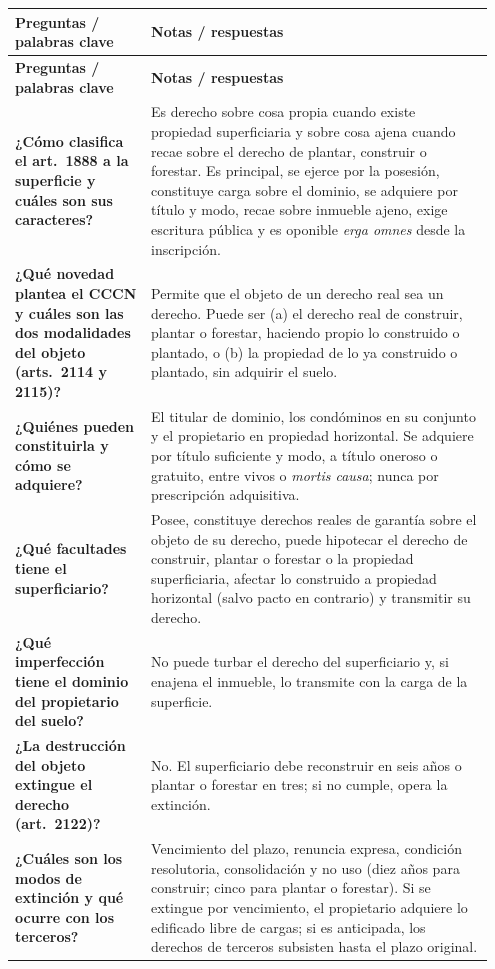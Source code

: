 \documentclass[12pt,oneside]{book}
\makeatletter
\newenvironment{cornell}{%
    \par\vspace{0.5em}
    \noindent
    \begin{longtable}{@{}>{\raggedright\arraybackslash}p{0.27\linewidth}
                         >{\raggedright\arraybackslash}p{0.68\linewidth}@{}}
    \toprule
    \textbf{Preguntas / palabras clave} & \textbf{Notas / respuestas} \\
    \midrule
    \endfirsthead
    \toprule
    \textbf{Preguntas / palabras clave} & \textbf{Notas / respuestas} \\
    \midrule
    \endhead
}{%
    \bottomrule
    \end{longtable}
}
\makeatother
\begin{document}
\begin{cornell}
\textbf{¿Cómo clasifica el art.~1888 a la superficie y cuáles son sus caracteres?} &
Es derecho sobre cosa propia cuando existe propiedad superficiaria y sobre cosa ajena cuando recae sobre el derecho de plantar, construir o forestar. Es principal, se ejerce por la posesión, constituye carga sobre el dominio, se adquiere por título y modo, recae sobre inmueble ajeno, exige escritura pública y es oponible \textit{erga omnes} desde la inscripción. \\

\textbf{¿Qué novedad plantea el CCCN y cuáles son las dos modalidades del objeto (arts.~2114 y 2115)?} &
Permite que el objeto de un derecho real sea un derecho. Puede ser (a) el derecho real de construir, plantar o forestar, haciendo propio lo construido o plantado, o (b) la propiedad de lo ya construido o plantado, sin adquirir el suelo. \\

\textbf{¿Quiénes pueden constituirla y cómo se adquiere?} &
El titular de dominio, los condóminos en su conjunto y el propietario en propiedad horizontal. Se adquiere por título suficiente y modo, a título oneroso o gratuito, entre vivos o \textit{mortis causa}; nunca por prescripción adquisitiva. \\

\textbf{¿Qué facultades tiene el superficiario?} &
Posee, constituye derechos reales de garantía sobre el objeto de su derecho, puede hipotecar el derecho de construir, plantar o forestar o la propiedad superficiaria, afectar lo construido a propiedad horizontal (salvo pacto en contrario) y transmitir su derecho. \\

\textbf{¿Qué imperfección tiene el dominio del propietario del suelo?} &
No puede turbar el derecho del superficiario y, si enajena el inmueble, lo transmite con la carga de la superficie. \\

\textbf{¿La destrucción del objeto extingue el derecho (art.~2122)?} &
No. El superficiario debe reconstruir en seis años o plantar o forestar en tres; si no cumple, opera la extinción. \\

\textbf{¿Cuáles son los modos de extinción y qué ocurre con los terceros?} &
Vencimiento del plazo, renuncia expresa, condición resolutoria, consolidación y no uso (diez años para construir; cinco para plantar o forestar). Si se extingue por vencimiento, el propietario adquiere lo edificado libre de cargas; si es anticipada, los derechos de terceros subsisten hasta el plazo original. \\


\end{cornell}
\end{document}
